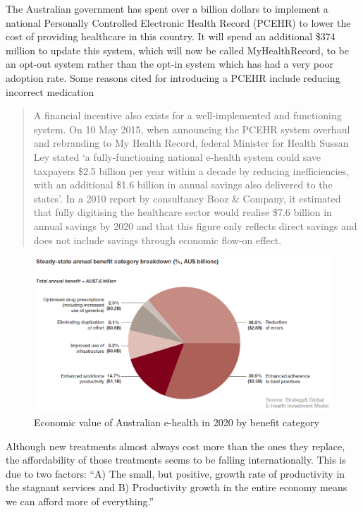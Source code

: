 The Australian government has spent over a billion dollars to implement a national Personally Controlled Electronic Health Record (PCEHR) to lower the cost of providing healthcare in this country. It will spend an additional \$374 million to update this system, which will now be called MyHealthRecord, to be an opt-out system rather than the opt-in system which has had a very poor adoption rate\cite{RefWorks:366}. Some reasons cited for introducing a PCEHR include reducing incorrect medication

\begin{quotation}
A financial incentive also exists for a well‐implemented and functioning system. On 10 May
2015, when announcing the PCEHR system overhaul and rebranding to My Health Record,
federal Minister for Health Sussan Ley stated `a fully-functioning national e-health system
could save taxpayers \$2.5 billion per year within a decade by reducing inefficiencies,
with an additional \$1.6 billion in annual savings also delivered to the states'. 
In a 2010 report by consultancy Booz \& Company, it estimated that fully digitising
the healthcare sector would realise \$7.6 billion in annual savings by 2020 and that this
figure only reflects direct savings and does not include savings through economic flow-on
effect.
\end{quotation} 

\begin{figure}
\centering
\includegraphics[scale=0.6]{figures/Optimising-e-health-value.png}
\caption{Economic value of Australian e-health in 2020 by benefit category\cite[p14]{RefWorks:368}}
\label{fig:SavingsEHealth}
\end{figure}

Although new treatments almost always cost more than the ones they replace, the affordability of those treatments seems to be falling internationally. This is due to two factors: ``A) The small, but positive, growth rate of productivity in the stagnant services and B) Productivity growth in the entire economy means we can afford more of everything\cite[p631-2]{RefWorks:208}.''

